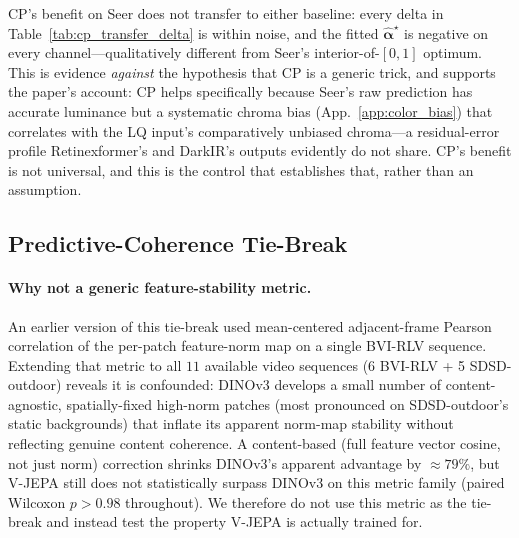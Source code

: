 CP's benefit on Seer does not transfer to either baseline: every delta in Table~\ref{tab:cp_transfer_delta} is within noise, and the fitted $\widehat{\boldsymbol{\alpha}}^{\star}$ is negative on every channel---qualitatively different from Seer's interior-of-$[0,1]$ optimum. This is evidence \emph{against} the hypothesis that CP is a generic trick, and supports the paper's account: CP helps specifically because Seer's raw prediction has accurate luminance but a systematic chroma bias (App.~\ref{app:color_bias}) that correlates with the LQ input's comparatively unbiased chroma---a residual-error profile Retinexformer's and DarkIR's outputs evidently do not share. CP's benefit is not universal, and this is the control that establishes that, rather than an assumption.


\subsection{Predictive-Coherence Tie-Break}\label{app:predictive_coherence}

\paragraph{Why not a generic feature-stability metric.} An earlier version of this tie-break used mean-centered adjacent-frame Pearson correlation of the per-patch feature-norm map on a single BVI-RLV sequence. Extending that metric to all $11$ available video sequences (6 BVI-RLV + 5 SDSD-outdoor) reveals it is confounded: DINOv3 develops a small number of content-agnostic, spatially-fixed high-norm patches (most pronounced on SDSD-outdoor's static backgrounds) that inflate its apparent norm-map stability without reflecting genuine content coherence. A content-based (full feature vector cosine, not just norm) correction shrinks DINOv3's apparent advantage by $\approx\!79\%$, but V-JEPA still does not statistically surpass DINOv3 on this metric family (paired Wilcoxon $p\!>\!0.98$ throughout). We therefore do not use this metric as the tie-break and instead test the property V-JEPA is actually trained for.

